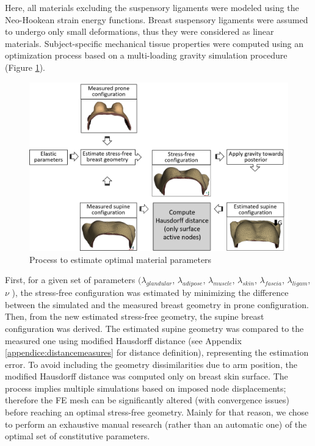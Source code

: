  Here, all materials excluding the suspensory ligaments were modeled using the Neo-Hookean strain energy functions. Breast suspensory ligaments were assumed to undergo only small deformations, thus they were considered as linear materials.  Subject-specific mechanical tissue properties were computed using an optimization process based on a multi-loading gravity simulation procedure (Figure \ref{fig:optimizationalgo}).
 
 \begin{figure}[!h]
\centering
\includegraphics[width=1\textwidth,keepaspectratio]{figures/optimizationMaterialParameters.png} 
\caption{Process to estimate optimal material parameters}\label{fig:optimizationalgo}
\end{figure}
 
  First, for a given set of parameters $(\lambda_{glandular}$, $\lambda_{adipose}$, $ \lambda_{muscle}$,  $\lambda_{skin}$, $\lambda_{fascia}$, $\lambda_{ligam}$, $\nu$ ), the stress-free configuration was estimated by minimizing the difference between the simulated and the measured breast geometry in prone configuration. Then, from the new estimated stress-free geometry, the supine breast configuration was derived. The estimated supine geometry was compared to the measured one using modified Hausdorff distance (see Appendix \ref{appendice:distancemeasures} for distance definition), representing the estimation error.  To avoid including the geometry dissimilarities due to arm position, the modified Hausdorff distance was computed only on breast skin surface.  
The process implies multiple simulations based on imposed node displacements; therefore the FE mesh can be significantly altered (with convergence issues) before reaching an optimal stress-free geometry. Mainly for that reason, we chose to perform an exhaustive manual research (rather than an automatic one) of the optimal set of constitutive parameters. 


